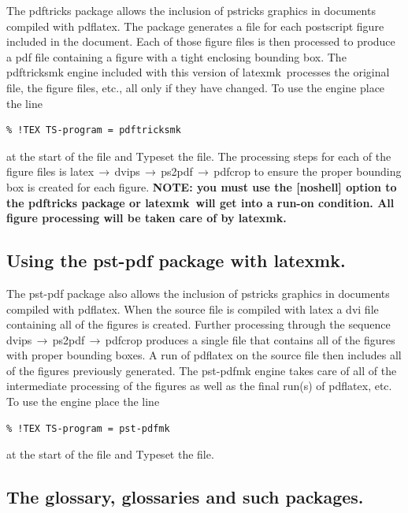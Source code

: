 \documentclass[11pt]{article}
\newcommand{\cmd}[1]{\textsf{#1}}
\newcommand{\To}{\,\(\to\)\,}
\newcommand{\latexmk}{\textsf{latexmk}}
\begin{document}
The \cmd{pdftricks} package allows the inclusion of \cmd{pstricks} graphics in documents compiled with \cmd{pdflatex}. The package generates a file for each postscript figure included in the document. Each of those figure files is then processed to produce a \cmd{pdf} file containing a figure with a tight enclosing bounding box. The \cmd{pdftricksmk} engine included with this version of \latexmk\ processes the original file, the figure files, etc., all only if they have changed. To use the engine place the line
\begin{verbatim}
% !TEX TS-program = pdftricksmk
\end{verbatim}
at the start of the file and Typeset the file. The processing steps for each of the figure files is \cmd{latex}\To\cmd{dvips}\To\cmd{ps2pdf}\To\cmd{pdfcrop} to ensure the proper bounding box is created for each figure. \textbf{NOTE: you must use the \cmd{[noshell]} option to the \cmd{pdftricks} package or \latexmk\ will get into a run-on condition. All figure processing will be taken care of by \latexmk.}

\subsection{Using the \cmd{pst-pdf} package with \latexmk.}

The \cmd{pst-pdf} package also allows the inclusion of \cmd{pstricks} graphics in documents compiled with \cmd{pdflatex}. When the source file is compiled with \cmd{latex} a \cmd{dvi} file containing all of the figures is created. Further processing through the sequence \cmd{dvips}\To\cmd{ps2pdf}\To\cmd{pdfcrop} produces a single file that contains all of the figures with proper bounding boxes. A run of \cmd{pdflatex} on the source file then includes all of the figures previously generated. The \cmd{pst-pdfmk} engine takes care of all of the intermediate processing of the figures as well as the final run(s) of \cmd{pdflatex}, etc. To use the engine place the line
\begin{verbatim}
% !TEX TS-program = pst-pdfmk
\end{verbatim}
at the start of the file and Typeset the file.

\subsection{The \cmd{glossary}, \cmd{glossaries} and such packages.}
\end{document}

